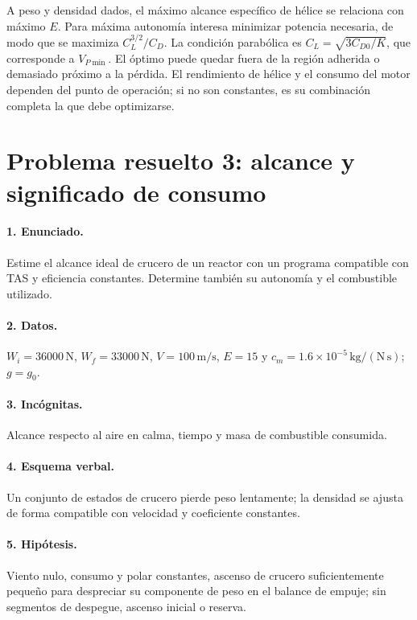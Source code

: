 A peso y densidad dados, el máximo alcance específico de hélice se relaciona con máximo $E$. Para máxima autonomía interesa minimizar potencia necesaria, de modo que se maximiza $C_L^{3/2}/C_D$. La condición parabólica es $C_L=\sqrt{3C_{D0}/K}$, que corresponde a $V_{P\min}$. El óptimo puede quedar fuera de la región adherida o demasiado próximo a la pérdida. El rendimiento de hélice y el consumo del motor dependen del punto de operación; si no son constantes, es su combinación completa la que debe optimizarse.


\section{Problema resuelto 3: alcance y significado de consumo}
\paragraph{1. Enunciado.} Estime el alcance ideal de crucero de un reactor con un programa compatible con TAS y eficiencia constantes. Determine también su autonomía y el combustible utilizado.
\paragraph{2. Datos.} $W_i=36000\,\mathrm N$, $W_f=33000\,\mathrm N$, $V=100\,\mathrm{m/s}$, $E=15$ y $c_m=1.6\times10^{-5}\,\mathrm{kg/(N\,s)}$; $g=g_0$.
\paragraph{3. Incógnitas.} Alcance respecto al aire en calma, tiempo y masa de combustible consumida.
\paragraph{4. Esquema verbal.} Un conjunto de estados de crucero pierde peso lentamente; la densidad se ajusta de forma compatible con velocidad y coeficiente constantes.
\paragraph{5. Hipótesis.} Viento nulo, consumo y polar constantes, ascenso de crucero suficientemente pequeño para despreciar su componente de peso en el balance de empuje; sin segmentos de despegue, ascenso inicial o reserva.
